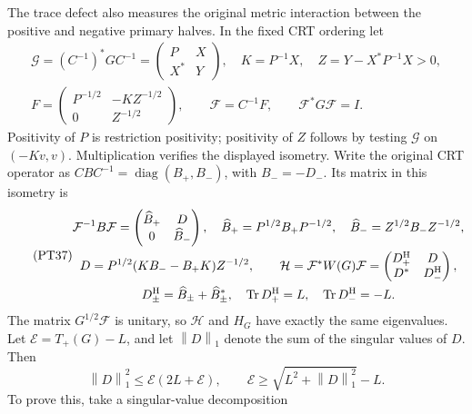 \documentclass[11pt]{article}
\newcommand{\norm}[1]{\left\lVert#1\right\rVert}
\DeclareMathOperator{\Tr}{Tr}
\DeclareMathOperator{\diag}{diag}
\begin{document}
The trace defect also measures the original metric interaction
between the positive and negative primary halves. In the fixed
CRT ordering let
\begin{equation}\tag{PT36}
 \begin{gathered}
 \mathcal G=(C^{-1})^*GC^{-1}
       =\begin{pmatrix}P&X\\X^*&Y\end{pmatrix},\quad
 K=P^{-1}X,\quad Z=Y-X^*P^{-1}X>0,\\
 F=\begin{pmatrix}P^{-1/2}&-KZ^{-1/2}\\0&Z^{-1/2}\end{pmatrix},
 \qquad\mathcal F=C^{-1}F,\qquad\mathcal F^*G\mathcal F=I.
 \end{gathered}
\end{equation}
Positivity of \(P\) is restriction positivity; positivity of
\(Z\) follows by testing \(\mathcal G\) on \((-Kv,v)\).
Multiplication verifies the displayed isometry. Write the original
CRT operator as \(CBC^{-1}=\diag(B_+,B_-)\), with
\(B_-=-D_-\). Its matrix in this isometry is
\begin{equation}\tag{PT37}
 \begin{gathered}
 \mathcal F^{-1}B\mathcal F
   =\begin{pmatrix}\widehat B_+&D\\0&\widehat B_-\end{pmatrix},
 \quad\widehat B_+=P^{1/2}B_+P^{-1/2},\quad
 \widehat B_-=Z^{1/2}B_-Z^{-1/2},\\
 D=P^{1/2}(KB_--B_+K)Z^{-1/2},\qquad
 \mathcal H=\mathcal F^*W(G)\mathcal F
   =\begin{pmatrix}D_+^{\rm H}&D\\D^*&D_-^{\rm H}\end{pmatrix},\\
 D_\pm^{\rm H}=\widehat B_\pm+\widehat B_\pm^*,\quad
 \Tr D_+^{\rm H}=L,\quad\Tr D_-^{\rm H}=-L.
 \end{gathered}
\end{equation}
The matrix \(G^{1/2}\mathcal F\) is unitary, so \(\mathcal H\)
and \(H_G\) have exactly the same eigenvalues. Let
\(\mathcal E=T_+(G)-L\), and let \(\norm D_1\) denote the
sum of the singular values of \(D\). Then
\begin{equation}\tag{PT38}
 \norm D_1^2\le\mathcal E(2L+\mathcal E),\qquad
 \mathcal E\ge\sqrt{L^2+\norm D_1^2}-L.
\end{equation}
To prove this, take a singular-value decomposition
\end{document}
